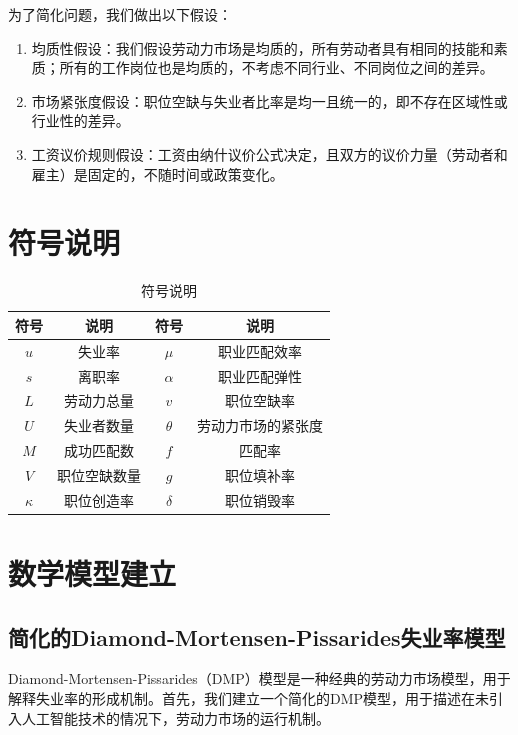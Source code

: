 \documentclass{article}
\begin{document}
为了简化问题，我们做出以下假设：

\begin{enumerate}[label=(\arabic*)]
    \item 均质性假设：我们假设劳动力市场是均质的，所有劳动者具有相同的技能和素质；所有的工作岗位也是均质的，不考虑不同行业、不同岗位之间的差异。
    \item 市场紧张度假设：职位空缺与失业者比率是均一且统一的，即不存在区域性或行业性的差异。 
    \item 工资议价规则假设：工资由纳什议价公式决定，且双方的议价力量（劳动者和雇主）是固定的，不随时间或政策变化。
\end{enumerate}

\section{符号说明}

\begin{table}[H]
    \centering
    \begin{tabular}{cccc}
        \toprule
        符号 & 说明 & 符号 & 说明 \\
        \midrule
        $u$ & 失业率 & $\mu$ & 职业匹配效率 \\
        $s$ & 离职率 & $\alpha$ & 职业匹配弹性 \\
        $L$ & 劳动力总量 & $v$ & 职位空缺率 \\
        $U$ & 失业者数量 & $\theta$ & 劳动力市场的紧张度 \\
        $M$ & 成功匹配数 & $f$ & 匹配率\\
        $V$ & 职位空缺数量 & $g$ & 职位填补率 \\
        $\kappa$ & 职位创造率 & $\delta$ & 职位销毁率 \\
        \bottomrule
    \end{tabular}
    \caption{符号说明}
\end{table}

\section{数学模型建立}

\subsection{简化的Diamond-Mortensen-Pissarides失业率模型}

Diamond-Mortensen-Pissarides（DMP）模型\cite{diamond1982aggregate}\cite{mortensen1982property}是一种经典的劳动力市场模型，用于解释失业率的形成机制。首先，我们建立一个简化的DMP模型，用于描述在未引入人工智能技术的情况下，劳动力市场的运行机制。
\end{document}
